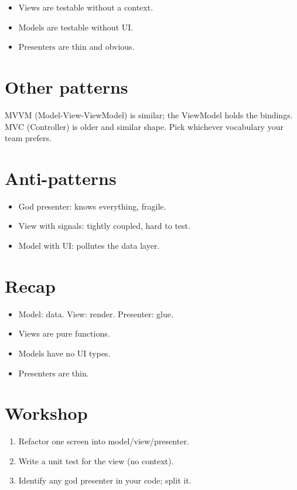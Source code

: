 \begin{itemize}[leftmargin=*]
  \item Views are testable without a context.
  \item Models are testable without UI.
  \item Presenters are thin and obvious.
\end{itemize}

\section{Other patterns}

MVVM (Model-View-ViewModel) is similar; the ViewModel
holds the bindings. MVC (Controller) is older and similar
shape. Pick whichever vocabulary your team prefers.

\section{Anti-patterns}

\begin{itemize}[leftmargin=*]
  \item God presenter: knows everything, fragile.
  \item View with signals: tightly coupled, hard to test.
  \item Model with UI: pollutes the data layer.
\end{itemize}

\section{Recap}

\begin{recap}
\begin{itemize}[leftmargin=*]
  \item Model: data. View: render. Presenter: glue.
  \item Views are pure functions.
  \item Models have no UI types.
  \item Presenters are thin.
\end{itemize}
\end{recap}

\section*{Workshop}

\begin{enumerate}[leftmargin=*]
  \item Refactor one screen into model/view/presenter.
  \item Write a unit test for the view (no context).
  \item Identify any god presenter in your code; split
    it.
\end{enumerate}

